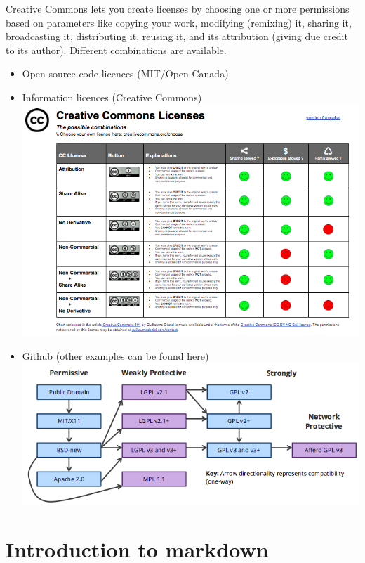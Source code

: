 \documentclass[
]{book}
\begin{document}
Creative Commons lets you create licenses by choosing one or more permissions based on parameters like copying your work, modifying (remixing) it, sharing it, broadcasting it, distributing it, reusing it, and its attribution (giving due credit to its author). Different combinations are available.

\begin{itemize}
\item
  Open source code licences (MIT/Open Canada)
\item
  Information licences (Creative Commons)
  \includegraphics{rr-presentation-figure/cc.png}
\item
  Github (other examples can be found \href{https://2015.igem.org/Team:Cambridge-JIC/OpenHardwareRevolution}{here})
  \includegraphics{rr-presentation-figure/opensource.png}
\end{itemize}

\hypertarget{introduction-to-markdown}{%
\chapter{Introduction to markdown}\label{introduction-to-markdown}}
\end{document}
